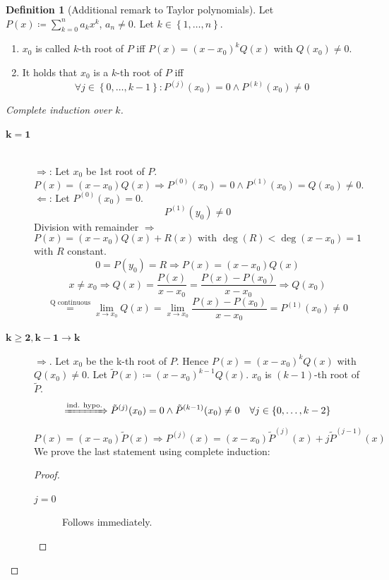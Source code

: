 \documentclass[a4paper,landscape,twocolumn]{article}
\theoremstyle{definition}
\newtheorem{defi}{Definition}
\newcommand\set[1]{\left\{#1\right\}}
\begin{document}
\begin{defi}[Additional remark to Taylor polynomials]
  Let $P(x) \coloneqq \sum_{k=0}^n a_k x^k$, $a_n \neq 0$. Let $k \in \set{1, \ldots, n}$.
  \begin{enumerate}
    \item $x_0$ is called $k$-th root of $P$ iff $P(x) = (x - x_0)^k Q(x)$ with $Q(x_0) \neq 0$.
    \item It holds that $x_0$ is a $k$-th  root of $P$ iff
      \[ \forall j \in \set{0,\ldots,k-1}: P^{(j)}(x_0) = 0 \land P^{(k)}(x_0) \neq 0 \]
  \end{enumerate}
\end{defi}
\begin{proof}[Complete induction over $k$]
  \begin{description}
    \item[$\mathbf{k=1}$] \hfill{} \\
      $\Rightarrow$: Let $x_0$ be 1st root of $P$.
        \[ P(x) = (x - x_0) Q(x) \Rightarrow P^{(0)}(x_0) = 0 \land P^{(1)}(x_0) = Q(x_0) \neq 0. \]
      $\Leftarrow$: Let $P^{(0)}(x_0) = 0$.
        \[ P^{(1)}(y_0) \neq 0 \]
        Division with remainder $\Rightarrow$
        \[ P(x) = (x - x_0) Q(x) + R(x) \text{ with } \deg(R) < \deg(x - x_0) = 1 \]
        with $R$ constant.
        \[ 0 = P(y_0) = R \Rightarrow P(x) = (x - x_0) Q(x) \]
        \[
          x \neq x_0 \Rightarrow Q(x) = \frac{P(x)}{x - x_0}
          = \frac{P(x) - P(x_0)}{x - x_0}
          \Rightarrow Q(x_0)
        \] \[
          \overset{\text{Q continuous}}{=}
          \lim_{x\to x_0} Q(x) = \lim_{x \to x_0} \frac{P(x) - P(x_0)}{x - x_0}
          = P^{(1)}(x_0) \neq 0
        \]
    \item[$\mathbf{k\geq 2, k-1 \to k}$]
      $\Rightarrow$. Let $x_0$ be the k-th root of $P$.
      Hence $P(x) = (x - x_0)^k Q(x)$ with $Q(x_0) \neq 0$.
      Let $\tilde{P}(x) \coloneqq (x - x_0)^{k-1} Q(x)$.
      $x_0$ is $(k-1)$-th root of $\tilde{P}$.
      \[
        \xRightarrow{\text{ind. hypo.}}
        \tilde{P}^{(j)}(x_0) = 0
        \land \tilde{P}^{(k-1)}(x_0) \neq 0
        \quad \forall j \in \set{0,\ldots,k-2}
      \] \[
        P(x) = (x - x_0) \tilde{P}(x) \Rightarrow
        P^{(j)}(x) = (x - x_0) \tilde{P}^{(j)}(x) + j \tilde{P}^{(j-1)}(x)
      \]
      We prove the last statement using complete induction:
      \begin{proof}
        \begin{description}
          \item[$j=0$]
            Follows immediately.

\end{description}
\end{proof}
\end{description}
\end{proof}
\end{document}

